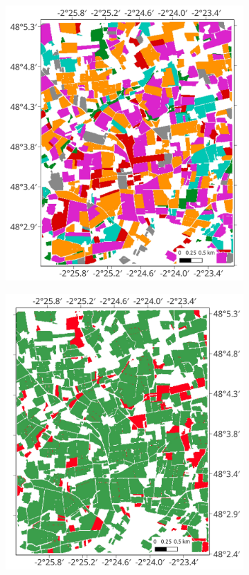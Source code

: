 \documentclass[journal,article,submit,pdftex,moreauthors]{Definitions/mdpi}
\begin{document}
\begin{figure}[H]
\begin{subfigure}[t]{0.35\linewidth}
    \includegraphics[height=\linewidth,width=\textwidth]{round2_remote_sensing_Andrea_Gonzalez/figures/classification_maps/test_aoi_field-base.pdf}
	  \caption{}
	  \label{fig:test_aoi_field-base}
	\end{subfigure}
	\begin{subfigure}[t]{0.35\linewidth}
    \includegraphics[height=\linewidth,width=\textwidth]{round2_remote_sensing_Andrea_Gonzalez/figures/classification_maps/true_positive_map.pdf}
	  \caption{}
	  \label{fig:true_positive_map}
	\end{subfigure}
    

\end{figure}
\end{document}
